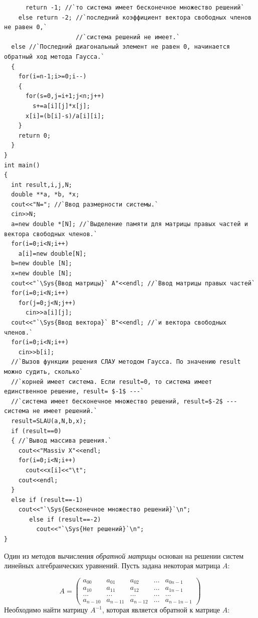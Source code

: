\begin{lstlisting}
      return -1; //`то система имеет бесконечное множество решений`
    else return -2; //`последний коэффициент вектора свободных членов не равен 0,`
                    //`система решений не имеет.`
  else //`Последний диагональный элемент не равен 0, начинается обратный ход метода Гаусса.`
  {
    for(i=n-1;i>=0;i--)
    {
      for(s=0,j=i+1;j<n;j++)
        s+=a[i][j]*x[j];
      x[i]=(b[i]-s)/a[i][i];
    }
    return 0;
  }	
}
int main()
{
  int result,i,j,N;
  double **a, *b, *x; 
  cout<<"N="; //`Ввод размерности системы.`
  cin>>N;
  a=new double *[N]; //`Выделение памяти для матрицы правых частей и вектора свободных членов.`
  for(i=0;i<N;i++)
    a[i]=new double[N];
  b=new double [N];
  x=new double [N];
  cout<<"`\Sys{Ввод матрицы}` A"<<endl; //`Ввод матрицы правых частей`
  for(i=0;i<N;i++)
    for(j=0;j<N;j++)
      cin>>a[i][j];
  cout<<"`\Sys{Ввод вектора}` B"<<endl; //`и вектора свободных членов.`
  for(i=0;i<N;i++)
    cin>>b[i];
  //`Вызов функции решения СЛАУ методом Гаусса. По значению result можно судить, сколько` 
  //`корней имеет система. Если result=0, то система имеет единственное решение, result= $-1$ ---`
  //`система имеет бесконечное множество решений, result=$-2$ --- система не имеет решений.`
  result=SLAU(a,N,b,x);
  if (result==0)
  { //`Вывод массива решения.`
    cout<<"Massiv X"<<endl;
    for(i=0;i<N;i++)
      cout<<x[i]<<"\t";
    cout<<endl;
  }
  else if (result==-1)
    cout<<"`\Sys{Бесконечное множество решений}`\n";
       else if (result==-2)
         cout<<"`\Sys{Нет решений}`\n";
}
\end{lstlisting}


Один из методов вычисления \emph{обратной матрицы} основан на решении
систем линейных алгебраических уравнений. Пусть задана некоторая матрица $A$:

\begin{equation}\label{ch06:prg4a}
A=\left(\begin{matrix}a_{00}&a_{01}&a_{02}&...&a_{0n-1}\\a_{10}&a_{11}&a_{12}&...&a_{1n-1}\\...&...&...&...&...\\a_{n-10}&a_{n-11}&a_{n-12}&...&a_{n-1n-1}\end{matrix}\right)
\end{equation}
Необходимо найти матрицу $A^{-1}$, которая является обратной к матрице $A$:

